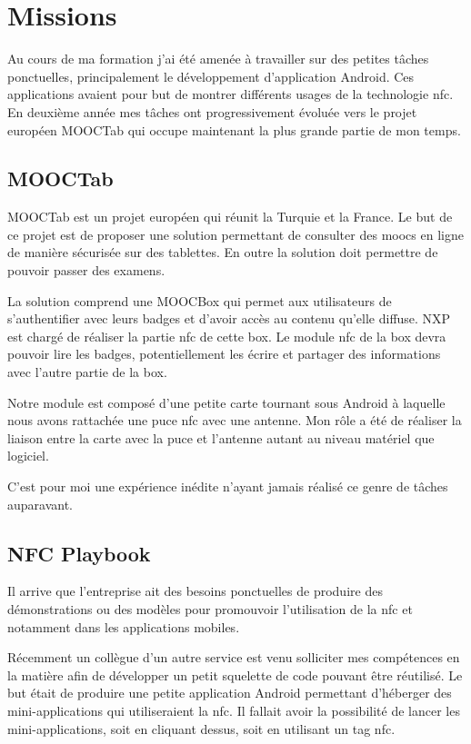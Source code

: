 \documentclass[french,12pt,a4paper,titlepage,openright,openbib]{report}
\begin{document}
\chapter{Missions}
Au cours de ma formation j'ai été amenée à travailler sur des petites tâches ponctuelles, principalement le développement d'application Android. Ces applications avaient pour but de montrer différents usages de la technologie \gls{nfc}.
En deuxième année mes tâches ont progressivement évoluée vers le projet européen MOOCTab qui occupe maintenant la plus grande partie de mon temps.
\section{MOOCTab}
MOOCTab est un projet européen qui réunit la Turquie et la France. Le but de ce projet est de proposer une solution permettant de consulter des \glspl{mooc} en ligne de manière sécurisée sur des tablettes. En outre la solution doit permettre de pouvoir passer des examens.

La solution comprend une MOOCBox qui permet aux utilisateurs de s'authentifier avec leurs badges et d'avoir accès au contenu qu'elle diffuse. NXP est chargé de réaliser la partie \gls{nfc} de cette box.
Le module \gls{nfc} de la box devra pouvoir lire les badges, potentiellement les écrire et partager des informations avec l'autre partie de la box.

Notre module est composé d'une petite carte tournant sous Android à laquelle nous avons rattachée une puce \gls{nfc} avec une antenne. Mon rôle a été de réaliser la liaison entre la carte avec la puce et l'antenne autant au niveau matériel que logiciel.

C'est pour moi une expérience inédite n'ayant jamais réalisé ce genre de tâches auparavant.
\section{NFC Playbook}
Il arrive que l'entreprise ait des besoins ponctuelles de produire des démonstrations ou des modèles pour promouvoir l'utilisation de la \gls{nfc} et notamment dans les applications mobiles.

Récemment un collègue d'un autre service est venu solliciter mes compétences en la matière afin de développer un petit squelette de code pouvant être réutilisé.
Le but était de produire une petite application Android permettant d'héberger des mini-applications qui utiliseraient la \gls{nfc}. Il fallait avoir la possibilité de lancer les mini-applications, soit en cliquant dessus, soit en utilisant un tag \gls{nfc}.
\end{document}
